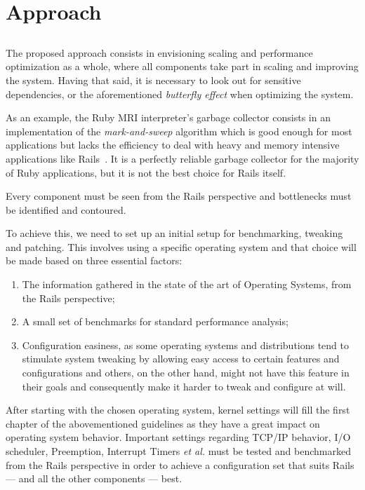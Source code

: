\chapter{Approach} %
\label{cha:approach}

\section*{} %
The proposed approach consists in envisioning scaling and performance optimization as a whole, where all components take part in scaling and improving the system. Having that said, it is necessary to look out for sensitive dependencies, or the aforementioned \textit{butterfly effect} when optimizing the system.

As an example, the Ruby MRI interpreter's garbage collector consists in an implementation of the \textit{mark-and-sweep} algorithm which is good enough for most applications but lacks the efficiency to deal with heavy and memory intensive applications like Rails~\cite{passenger_whatis}. It is a perfectly reliable garbage collector for the majority of Ruby applications, but it is not the best choice for Rails itself.

Every component must be seen from the Rails perspective and bottlenecks must be identified and contoured.

To achieve this, we need to set up an initial setup for benchmarking, tweaking and patching. This involves using a specific operating system and that choice will be made based on three essential factors:
\begin{enumerate}
  \item The information gathered in the state of the art of Operating Systems, from the Rails perspective;
  \item A small set of benchmarks for standard performance analysis;
  \item Configuration easiness, as some operating systems and distributions tend to stimulate system tweaking by allowing easy access to certain features and configurations and others, on the other hand, might not have this feature in their goals and consequently make it harder to tweak and configure at will.
\end{enumerate}
After starting with the chosen operating system, kernel settings will fill the first chapter of the abovementioned guidelines as they have a great impact on operating system behavior. Important settings regarding TCP/IP behavior, I/O scheduler, Preemption, Interrupt Timers \textit{et al.} must be tested and benchmarked from the Rails perspective in order to achieve a configuration set that suits Rails --- and all the other components --- best.


